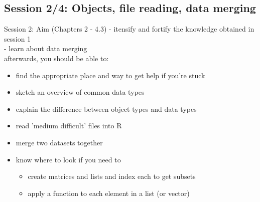 \documentclass[xcolor=table,           xcolor=dvipsnames]{beamer}\usepackage[]{graphicx}\usepackage[]{color}
\begin{document}
\subsection{Session 2/4: Objects, file reading, data merging}

\begin{frame}{Session 2: Aim (Chapters 2  - 4.3)}
\pause - itensify and fortify the knowledge obtained in session 1\\
\pause - learn about data merging\\
\pause afterwards, you should be able to:
\pause
\begin{itemize}[<+->]
\item find the appropriate place and way to get help if you're stuck
\item sketch an overview of common data types
\item explain the difference between object types and data types
\item read 'medium difficult' files into R
\item merge two datasets together
\item know where to look if you need to
   \begin{itemize}[<+->]
   \item create matrices and lists and index each to get subsets
   \item apply a function to each element in a list (or vector)
   \end{itemize}
\end{itemize}
\end{frame}

\end{document}
